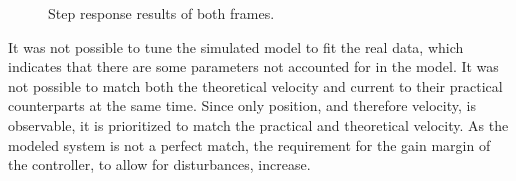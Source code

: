 \documentclass[../../main]{subfiles}
\begin{document}
\begin{figure}[H]
        \centering
				\def\svgwidth{0.47\columnwidth}
				\def\svgwidth{0.47\columnwidth}
				\caption{Step response results of both frames.}
				\label{fig:validation_steptuning}
\end{figure}
It was not possible to tune the simulated model to fit the real data,
which indicates that there are some parameters not accounted for in the model.
It was not possible to match both the theoretical velocity and current to their practical counterparts at the same time. Since only position, and therefore velocity, is observable, it is prioritized to match the practical and theoretical velocity.
As the modeled system is not a perfect match, the requirement for the gain margin of the controller, to allow for disturbances, increase.
\end{document}
